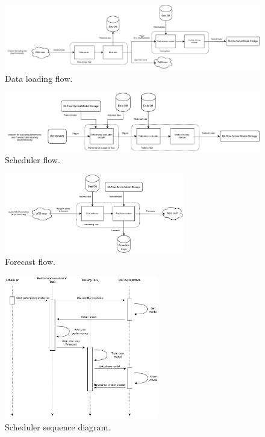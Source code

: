 \begin{figure}[H]
\centering 
\includegraphics[width=1\textwidth]{images/architecture_data_loading_flow} 
\caption{Data loading flow.}
\label{fig:loadingflow}
\end{figure}

\begin{figure}[H]
\centering 
\includegraphics[width=1\textwidth]{images/architecture_scheduler_flow} 
\caption{Scheduler flow.}
\label{fig:schedulerflow}
\end{figure}

\begin{figure}[H]
\centering 
\includegraphics[width=0.7\textwidth]{images/architecture_forecast_flow} 
\caption{Forecast flow.}
\label{fig:forecastflow}
\end{figure}

\begin{figure}[H]
\centering 
\includegraphics[width=0.6\textwidth]{images/architecture_scheduler_sequence} 
\caption{Scheduler sequence diagram.}
\label{fig:schedulersequence}
\end{figure}

